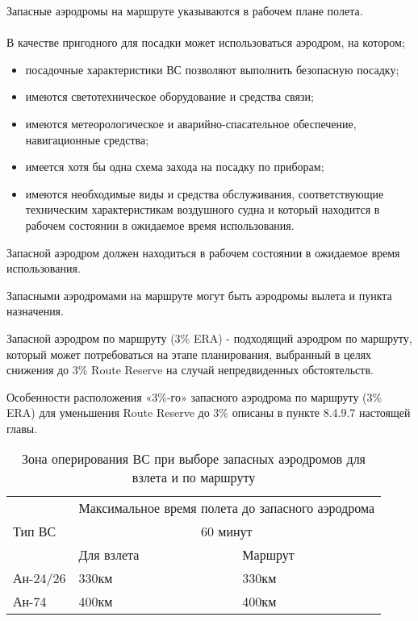 Запасные аэродромы на маршруте указываются в рабочем плане полета.

\paragraph{} В качестве пригодного для посадки может использоваться аэродром, на котором;
\begin{itemize}
    \item посадочные характеристики ВС позволяют выполнить безопасную посадку;
    \item имеются светотехническое оборудование и средства связи;
    \item имеются метеорологическое и аварийно-спасательное обеспечение, навигационные средства;
    \item имеется хотя бы одна схема захода на посадку по приборам;
    \item имеются необходимые виды и средства обслуживания, соответствующие техническим характеристикам воздушного судна и который находится в рабочем состоянии в ожидаемое время использования.
\end{itemize}

Запасной аэродром должен находиться в рабочем состоянии в ожидаемое время использования.

Запасными аэродромами на маршруте могут быть аэродромы вылета и пункта назначения.

Запасной аэродром по маршруту (3\% ERA) - подходящий аэродром по маршруту, который может потребоваться на этапе планирования, выбранный в целях снижения до 3\% Route Reserve на случай непредвиденных обстоятельств.

Особенности расположения «3\%-го» запасного аэродрома по маршруту (3\% ERA) для уменьшения Route Reserve до 3\% описаны в пункте 8.4.9.7 настоящей главы.


\begin{table}[H]
    \begin{center}
    \caption{Зона оперирования ВС при выборе запасных аэродромов для взлета и по маршруту}
    \begin{tabular}{|p{}|p{}|p{}|}
    \hline
    &\multicolumn{2}{c|}{Максимальное время полета до запасного аэродрома}\\
    \cline{2-3}
    Тип ВС&\multicolumn{2}{c|}{60 минут}\\
    \cline{2-3}
    &Для взлета&Маршрут\\
    \hline
    Ан-24/26	&330км	&330км\\
    \hline
    Ан-74	    &400км	&400км\\
    \hline\hline


    \end{tabular}
    \end{center}
\end{table}

